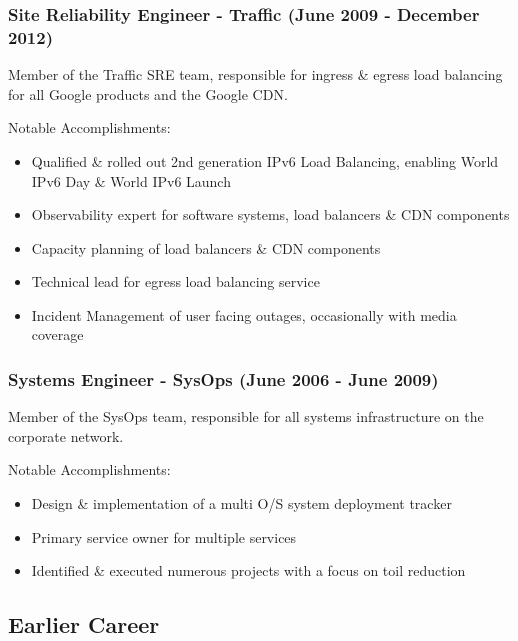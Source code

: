 \documentclass[a4paper, 10pt] {article}
\begin{document}
\subsubsection*{Site Reliability Engineer - Traffic (June 2009 - December 2012)}

Member of the Traffic SRE team, responsible for ingress \& egress load balancing for all Google products and the Google CDN. 

\vspace{3mm}  %

Notable Accomplishments:

\begin{itemize}
  \item Qualified \& rolled out 2nd generation IPv6 Load Balancing, enabling World IPv6 Day \& World IPv6 Launch
  \item Observability expert for software systems, load balancers \& CDN components
  \item Capacity planning of load balancers \& CDN components
  \item Technical lead for egress load balancing service
  \item Incident Management of user facing outages, occasionally with media coverage
\end{itemize}

\subsubsection*{Systems Engineer - SysOps (June 2006 - June 2009)}

Member of the SysOps team, responsible for all systems infrastructure on the corporate network.

\vspace{3mm}  %

Notable Accomplishments:

\begin{itemize}
  \item Design \& implementation of a multi O/S system deployment tracker
  \item Primary service owner for multiple services
  \item Identified \& executed numerous projects with a focus on toil reduction
\end{itemize}

\subsection*{Earlier Career}
\end{document}
